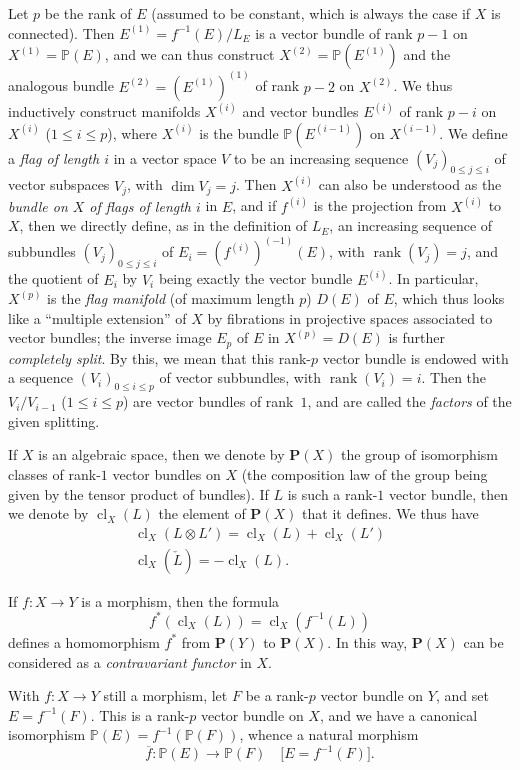 \documentclass{article}
\newcommand{\PP}{\mathbf{P}}
\renewcommand{\leq}{\leqslant}
\DeclareMathOperator{\rank}{rank}
\DeclareMathOperator{\cl}{cl}
\newcommand{\oldpage}[1]{\marginpar{\footnotesize$\Big\vert$ \textit{p.~#1}}}
\begin{document}
Let $p$ be the rank of $E$ (assumed to be constant, which is always the case if $X$ is connected).
Then $E^{(1)}=f^{-1}(E)/L_E$ is a vector bundle of rank $p-1$ on $X^{(1)}=\mathbb{P}(E)$, and we can thus construct $X^{(2)}=\mathbb{P}(E^{(1)})$ and the analogous bundle $E^{(2)}=(E^{(1)})^{(1)}$ of rank $p-2$ on $X^{(2)}$.
We thus inductively construct manifolds $X^{(i)}$ and vector bundles $E^{(i)}$ of rank $p-i$ on $X^{(i)}$ ($1\leq i\leq p$), where $X^{(i)}$ is the bundle $\mathbb{P}(E^{(i-1)})$ on $X^{(i-1)}$.
We define a \emph{flag of length $i$} in a vector space $V$ to be an increasing sequence $(V_j)_{0\leq j\leq i}$ of vector subspaces $V_j$, with $\dim V_j=j$.
Then $X^{(i)}$ can also be understood as the \emph{bundle on $X$ of flags of length $i$} in $E$, and if $f^{(i)}$ is the projection from $X^{(i)}$ to $X$, then we directly define, as in the definition of $L_E$, an increasing sequence of subbundles $(V_j)_{0\leq j\leq i}$ of $E_i=(f^{(i)})^{(-1)}(E)$, with $\rank(V_j)=j$, and the quotient of $E_i$ by $V_i$ being exactly the vector bundle $E^{(i)}$.
In particular, $X^{(p)}$ is the \emph{flag manifold} (of maximum length $p$) $D(E)$ of $E$, which thus looks like a ``multiple extension'' of $X$ by fibrations in projective spaces associated to vector bundles;
the inverse image $E_p$ of $E$ in $X^{(p)}=D(E)$ is further \emph{completely split}.
By this, we mean that this rank-$p$ vector bundle is endowed with a sequence $(V_i)_{0\leq i\leq p}$ of vector subbundles,
\oldpage{139}
with $\rank(V_i)=i$.
Then the $V_i/V_{i-1}$ ($1\leq i\leq p$) are vector bundles of rank~$1$, and are called the \emph{factors} of the given splitting.

If $X$ is an algebraic space, then we denote by $\PP(X)$ the group of isomorphism classes of rank-$1$ vector bundles on $X$ (the composition law of the group being given by the tensor product of bundles).
If $L$ is such a rank-$1$ vector bundle, then we denote by $\cl_X(L)$ the element of $\PP(X)$ that it defines.
We thus have
\begin{gather*}
  \cl_X(L\otimes L') = \cl_X(L) + \cl_X(L')
\\\cl_X(\check{L}) = -\cl_X(L).
\end{gather*}

If $f\colon X\to Y$ is a morphism, then the formula
\[
  f^*(\cl_X(L)) = \cl_X(f^{-1}(L))
\]
defines a homomorphism $f^*$ from $\PP(Y)$ to $\PP(X)$.
In this way, $\PP(X)$ can be considered as a \emph{contravariant functor} in $X$.

With $f\colon X\to Y$ still a morphism, let $F$ be a rank-$p$ vector bundle on $Y$, and set $E=f^{-1}(F)$.
This is a rank-$p$ vector bundle on $X$, and we have a canonical isomorphism $\mathbb{P}(E)=f^{-1}(\mathbb{P}(F))$, whence a natural morphism
\[
  \overline{f}\colon \mathbb{P}(E) \to \mathbb{P}(F)
  \quad\mbox{[$E=f^{-1}(F)$].}
\]
\end{document}
